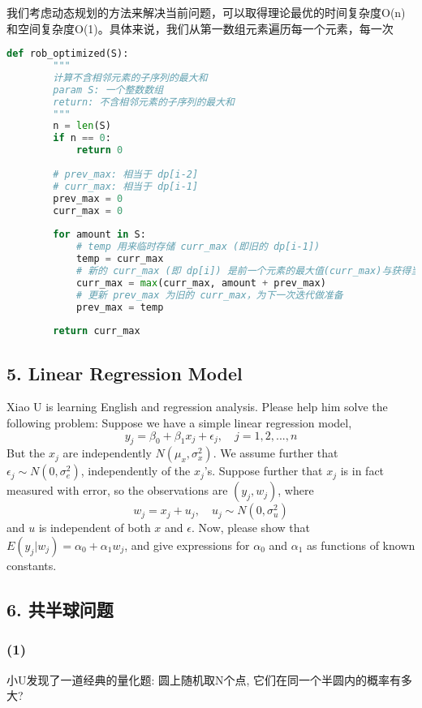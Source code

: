 \documentclass[UTF8]{ctexart}
\begin{document}
我们考虑动态规划的方法来解决当前问题，可以取得理论最优的时间复杂度O(n)和空间复杂度O(1)。具体来说，我们从第一数组元素遍历每一个元素，每一次
\begin{lstlisting}[language=Python, caption=O(1) 空间复杂度的解法]
    def rob_optimized(S):
        """
        计算不含相邻元素的子序列的最大和
        param S: 一个整数数组
        return: 不含相邻元素的子序列的最大和
        """
        n = len(S)
        if n == 0:
            return 0
        
        # prev_max: 相当于 dp[i-2]
        # curr_max: 相当于 dp[i-1]
        prev_max = 0
        curr_max = 0
    
        for amount in S:
            # temp 用来临时存储 curr_max (即旧的 dp[i-1])
            temp = curr_max
            # 新的 curr_max (即 dp[i]) 是前一个元素的最大值(curr_max)与获得当前元素(amount + prev_max)的较大值
            curr_max = max(curr_max, amount + prev_max)
            # 更新 prev_max 为旧的 curr_max，为下一次迭代做准备
            prev_max = temp
    
        return curr_max
\end{lstlisting}

\subsection*{5. Linear Regression Model}
Xiao U is learning English and regression analysis. Please help him solve the following problem:
Suppose we have a simple linear regression model,
$$ y_{j}=\beta_{0}+\beta_{1}x_{j}+\epsilon_{j}, \quad j=1,2,...,n $$
But the $x_{j}$ are independently $N(\mu_{x},\sigma_{x}^{2})$. We assume further that $\epsilon_{j}\sim N(0,\sigma_{e}^{2})$, independently of the $x_{j}$'s.
Suppose further that $x_{j}$ is in fact measured with error, so the observations are $(y_{j},w_{j})$, where
$$ w_{j}=x_{j}+u_{j}, \quad u_{j}\sim N(0,\sigma_{u}^{2}) $$
and $u$ is independent of both $x$ and $\epsilon$.
Now, please show that $E(y_{j}|w_{j})=\alpha_{0}+\alpha_{1}w_{j}$, and give expressions for $\alpha_{0}$ and $\alpha_{1}$ as functions of known constants.

\subsection*{6. 共半球问题}
\subsubsection*{(1)}
小U发现了一道经典的量化题: 圆上随机取N个点, 它们在同一个半圆内的概率有多大?
\end{document}
